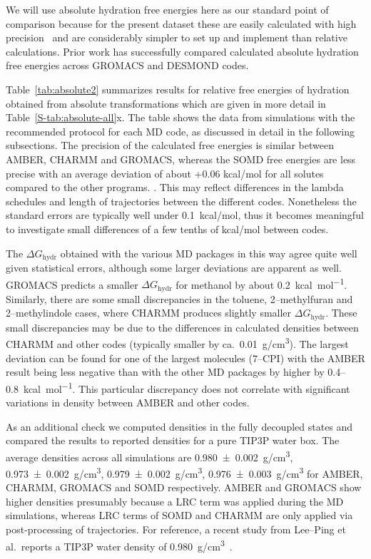 \documentclass[journal=jctcce,manuscript=article]{achemso}
\begin{document}
We will use absolute hydration free energies here as our standard point of
comparison because for the present dataset these are easily calculated with high precision~\cite{doi:10.1021/acs.jced.7b00104} %
and are considerably simpler to set up and implement than relative calculations.
Prior work has successfully compared calculated absolute hydration
free energies across GROMACS and DESMOND codes.~\cite{klimovich_predicting_2010}

Table~\ref{tab:absolute2} summarizes results for relative free energies of
hydration obtained from absolute transformations which are given in more detail in Table~\ref{S-tab:absolute-all}x.  The table shows the data
from simulations with the recommended protocol for each MD code, as
discussed in detail in the following subsections.
The  precision of the calculated free energies is similar between
AMBER, CHARMM and GROMACS, whereas the SOMD free energies are less
precise{\color{blue}
with an average deviation of about +0.06 kcal/mol for all solutes compared to the other programs.
}.  This may reflect differences in the lambda schedules and
length of trajectories between the different codes.  Nonetheless the
standard errors are typically well under \SI{0.1}{kcal/mol}, thus it
becomes meaningful to investigate small differences of a few tenths of
\si{kcal/mol} between codes.

The $\Delta G_{\mathrm{hydr}}$
obtained with the various MD packages in
this way agree quite well given statistical errors, although some larger deviations are apparent as
well.  GROMACS predicts a smaller $\Delta G_{\mathrm{hydr}}$ for
methanol by about \SI{+0.2}{kcal.mol^{-1}}.  Similarly, there are some
small discrepancies in the toluene, 2--methylfuran and 2--methylindole
cases, where CHARMM produces slightly smaller $\Delta
G_{\mathrm{hydr}}$.  These small discrepancies may be due to the
differences in calculated densities between CHARMM and other codes
(typically smaller by ca.\ \SI{0.01}{g/cm^3}).
The largest deviation can be found for one of the largest
molecules (7--CPI) with the AMBER result being less negative than with
the other MD packages by higher by 0.4--\SI{0.8}{kcal.mol^{-1}}.  This
particular discrepancy does not correlate with significant variations
in density between AMBER and other codes.

As an additional check we computed densities in the fully decoupled
states and compared the results to reported densities for a pure TIP3P
water box.  The average densities across all simulations are
\SI{0.980+-0.002}{g/cm^3}, \SI{0.973+-0.002}{g/cm^3},
\SI{0.979+-0.002}{g/cm^3}, \SI{0.976+-0.003}{g/cm^3} for AMBER,
CHARMM, GROMACS and SOMD respectively.  AMBER and GROMACS show higher
densities presumably because a LRC term was applied during the MD
simulations, whereas {\color{blue}LRC terms of SOMD and CHARMM are only applied via
post-processing of trajectories.}  For reference, a recent study from Lee--Ping et al.\ reports a
TIP3P water density of \SI{0.980}{g/cm^3}~\cite{doi:10.1021/jz500737m}.
\end{document}

